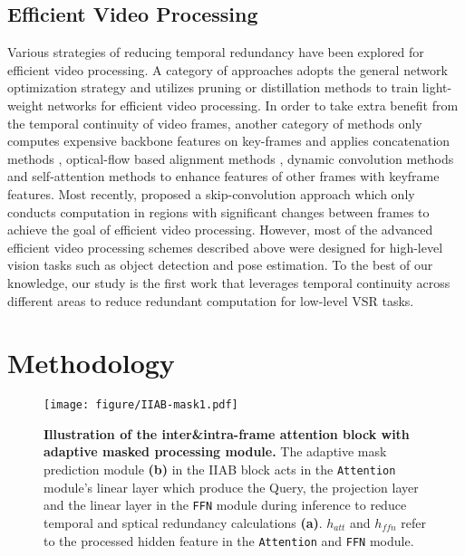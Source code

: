 \documentclass[10pt,twocolumn,letterpaper]{article}
\begin{document}
\subsection{Efficient Video Processing}
%
Various strategies of reducing temporal redundancy have been explored for efficient video processing.
%
A category of approaches adopts the general network optimization strategy and utilizes pruning \cite{xia2022residual} or distillation \cite{habibian2022delta} methods to train light-weight networks for efficient video processing.
%
In order to take extra benefit from the temporal continuity of video frames, another category of methods only computes expensive backbone features on key-frames and applies concatenation methods \cite{jain2019accel}, optical-flow based alignment methods \cite{zhu2017deep,li2018low,zhu2018towards,jain2019accel,nie2019dynamic,hu2020temporally}, dynamic convolution methods \cite{nie2019dynamic} and self-attention methods \cite{hu2020temporally,liu2022learning} to enhance features of other frames with keyframe features.
%
Most recently, \cite{habibian2021skip} proposed a skip-convolution approach which only conducts computation in regions with significant changes between frames to achieve the goal of efficient video processing.
%
However, most of the advanced efficient video processing schemes described above were designed for high-level vision tasks such as object detection and pose estimation. 
%
To the best of our knowledge, our study is the first work that leverages temporal continuity across different areas to reduce redundant computation for low-level VSR tasks.
\section{Methodology}
\label{sec:Method}


\begin{figure*}
\centering
\texttt{[image: figure/IIAB-mask1.pdf]}
\caption{\textbf{Illustration of the inter\&intra-frame attention block with adaptive masked processing module.} The adaptive mask prediction module \textbf{(b)} in the IIAB block acts in the \texttt{Attention} module's linear layer which produce the Query, the projection layer and the linear layer in the \texttt{FFN} module during inference to reduce temporal and sptical redundancy calculations \textbf{(a)}. $h_{att}$ and $h_{ffn}$ refer to the processed hidden feature in the \texttt{Attention} and \texttt{FFN} module.}
\label{IIABwithmask}
\end{figure*}
\end{document}
